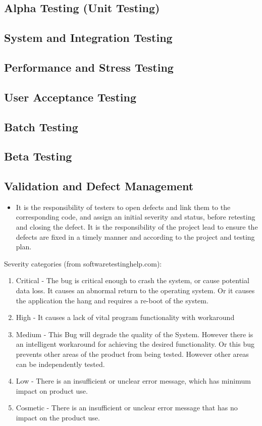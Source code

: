 \documentclass[12pt]{article}
\begin{document}
\subsection{Alpha Testing (Unit Testing)}
\subsection{System and Integration Testing}
\subsection{Performance and Stress Testing}
\subsection{User Acceptance Testing}
\subsection{Batch Testing}
\subsection{Beta Testing}

\subsection{Validation and Defect Management}
\begin{itemize}
    \item It is the responsibility of testers to open defects and link them to the corresponding code, and assign an initial severity and status, before retesting and closing the defect. It is the responsibility of the project lead to ensure the defects are fixed in a timely manner and according to the project and testing plan. 
\end{itemize}

Severity categories (from softwaretestinghelp.com):
\begin{enumerate}
    \item Critical - The bug is critical enough to crash the system, or cause potential data loss. It causes an abnormal return to the operating system. Or it causes the application the hang and requires a re-boot of the system.
    \item High - It causes a lack of vital program functionality with workaround
    \item Medium - This Bug will degrade the quality of the System. However there is an intelligent workaround for achieving the desired functionality. Or this bug prevents other areas of the product from being tested. However other areas can be independently tested.
    \item Low - There is an insufficient or unclear error message, which has minimum impact on product use.
    \item Cosmetic - There is an insufficient or unclear error message that has no impact on the product use.
\end{enumerate}
\end{document}
